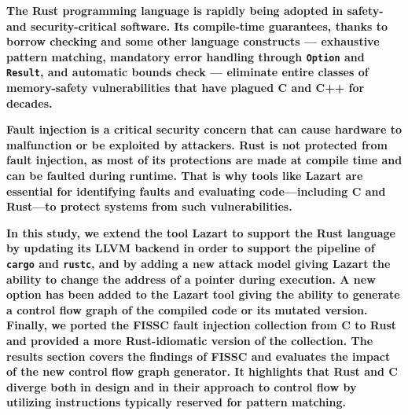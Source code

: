 \textbf{The Rust programming language \cite{27RustMatsakis} is rapidly being adopted in safety- and security-critical software. Its compile-time guarantees, thanks to borrow checking and some other language constructs — exhaustive pattern matching, mandatory error handling through \texttt{Option} and \texttt{Result}, and automatic bounds check — eliminate entire classes of memory-safety vulnerabilities that have plagued C and C++ for decades.}

\textbf{Fault injection is a critical security concern that can cause hardware to malfunction or be exploited by attackers. Rust is not protected from fault injection, as most of its protections are made at compile time and can be faulted during runtime.
That is why tools like Lazart are essential for identifying faults and evaluating code—including C and Rust—to protect systems from such vulnerabilities.}

\textbf{In this study, we extend the tool Lazart \cite{Lazart2015} to support the Rust language by updating its LLVM backend in order to support the pipeline of \texttt{cargo} and \texttt{rustc}, and by adding a new attack model giving Lazart the ability to change the address of a pointer during execution. A new option has been added to the Lazart tool giving the ability to generate a control flow graph of the compiled code or its mutated version.
Finally, we ported the FISSC fault injection collection from C to Rust and provided a more Rust-idiomatic version of the collection.
The results section covers the findings of FISSC and evaluates the impact of the new control flow graph generator. It highlights that Rust and C diverge both in design and in their approach to control flow by utilizing instructions typically reserved for pattern matching.}